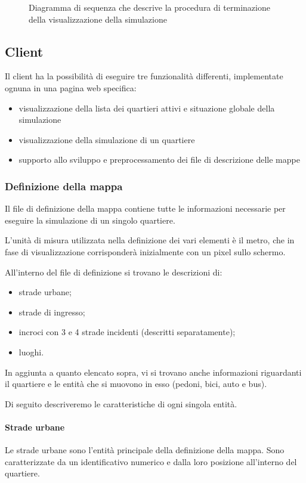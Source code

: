 \begin{figure}[H] %
\caption{Diagramma di sequenza che descrive la procedura di terminazione della
visualizzazione della simulazione}
\label{fig:stopwebserver}
\end{figure}

\subsection{Client}
Il client ha la possibilità di eseguire tre funzionalità differenti,
implementate ognuna in una pagina web specifica:
\begin{itemize}
	\item visualizzazione della lista dei quartieri attivi e situazione globale
	della simulazione
	\item visualizzazione della simulazione di un quartiere
	\item supporto allo sviluppo e preprocessamento dei file di descrizione delle
	mappe
\end{itemize}

\subsubsection{Definizione della mappa}
Il file di definizione della mappa contiene tutte le informazioni necessarie per
eseguire la simulazione di un singolo quartiere. 

L'unità di misura utilizzata nella definizione dei vari elementi è il metro, che
in fase di visualizzazione corrisponderà inizialmente con un pixel sullo
schermo.

All'interno del file di definizione si trovano le descrizioni di:
\begin{itemize}
	\item strade urbane;
	\item strade di ingresso;
	\item incroci con 3 e 4 strade incidenti (descritti separatamente);
	\item luoghi.
\end{itemize}

In aggiunta a quanto elencato sopra, vi si trovano anche informazioni
riguardanti il quartiere e le entità che si muovono in esso (pedoni, bici, auto
e bus).

Di seguito descriveremo le caratteristiche di ogni singola entità.

\paragraph*{Strade urbane}
Le strade urbane sono l'entità principale della definizione della mappa. Sono
caratterizzate da un identificativo numerico e dalla loro posizione all'interno
del quartiere. 

